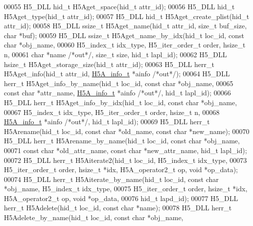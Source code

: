 \begin{DoxyCode}
00055 H5\_DLL hid\_t   H5Aget\_space(hid\_t attr\_id);
00056 H5\_DLL hid\_t   H5Aget\_type(hid\_t attr\_id);
00057 H5\_DLL hid\_t   H5Aget\_create\_plist(hid\_t attr\_id);
00058 H5\_DLL ssize\_t H5Aget\_name(hid\_t attr\_id, \textcolor{keywordtype}{size\_t} buf\_size, \textcolor{keywordtype}{char} *buf);
00059 H5\_DLL ssize\_t H5Aget\_name\_by\_idx(hid\_t loc\_id, \textcolor{keyword}{const} \textcolor{keywordtype}{char} *obj\_name,
00060     H5\_index\_t idx\_type, H5\_iter\_order\_t order, hsize\_t n,
00061     \textcolor{keywordtype}{char} *name \textcolor{comment}{/*out*/}, \textcolor{keywordtype}{size\_t} size, hid\_t lapl\_id);
00062 H5\_DLL hsize\_t H5Aget\_storage\_size(hid\_t attr\_id);
00063 H5\_DLL herr\_t  H5Aget\_info(hid\_t attr\_id, \hyperlink{struct_h5_a__info__t}{H5A\_info\_t} *ainfo \textcolor{comment}{/*out*/});
00064 H5\_DLL herr\_t  H5Aget\_info\_by\_name(hid\_t loc\_id, \textcolor{keyword}{const} \textcolor{keywordtype}{char} *obj\_name,
00065     \textcolor{keyword}{const} \textcolor{keywordtype}{char} *attr\_name, \hyperlink{struct_h5_a__info__t}{H5A\_info\_t} *ainfo \textcolor{comment}{/*out*/}, hid\_t lapl\_id);
00066 H5\_DLL herr\_t  H5Aget\_info\_by\_idx(hid\_t loc\_id, \textcolor{keyword}{const} \textcolor{keywordtype}{char} *obj\_name,
00067     H5\_index\_t idx\_type, H5\_iter\_order\_t order, hsize\_t n,
00068     \hyperlink{struct_h5_a__info__t}{H5A\_info\_t} *ainfo \textcolor{comment}{/*out*/}, hid\_t lapl\_id);
00069 H5\_DLL herr\_t  H5Arename(hid\_t loc\_id, \textcolor{keyword}{const} \textcolor{keywordtype}{char} *old\_name, \textcolor{keyword}{const} \textcolor{keywordtype}{char} *new\_name);
00070 H5\_DLL herr\_t  H5Arename\_by\_name(hid\_t loc\_id, \textcolor{keyword}{const} \textcolor{keywordtype}{char} *obj\_name,
00071     \textcolor{keyword}{const} \textcolor{keywordtype}{char} *old\_attr\_name, \textcolor{keyword}{const} \textcolor{keywordtype}{char} *new\_attr\_name, hid\_t lapl\_id);
00072 H5\_DLL herr\_t  H5Aiterate2(hid\_t loc\_id, H5\_index\_t idx\_type,
00073     H5\_iter\_order\_t order, hsize\_t *idx, H5A\_operator2\_t op, \textcolor{keywordtype}{void} *op\_data);
00074 H5\_DLL herr\_t  H5Aiterate\_by\_name(hid\_t loc\_id, \textcolor{keyword}{const} \textcolor{keywordtype}{char} *obj\_name, H5\_index\_t idx\_type,
00075     H5\_iter\_order\_t order, hsize\_t *idx, H5A\_operator2\_t op, \textcolor{keywordtype}{void} *op\_data,
00076     hid\_t lapd\_id);
00077 H5\_DLL herr\_t  H5Adelete(hid\_t loc\_id, \textcolor{keyword}{const} \textcolor{keywordtype}{char} *name);
00078 H5\_DLL herr\_t  H5Adelete\_by\_name(hid\_t loc\_id, \textcolor{keyword}{const} \textcolor{keywordtype}{char} *obj\_name,

\end{DoxyCode}
